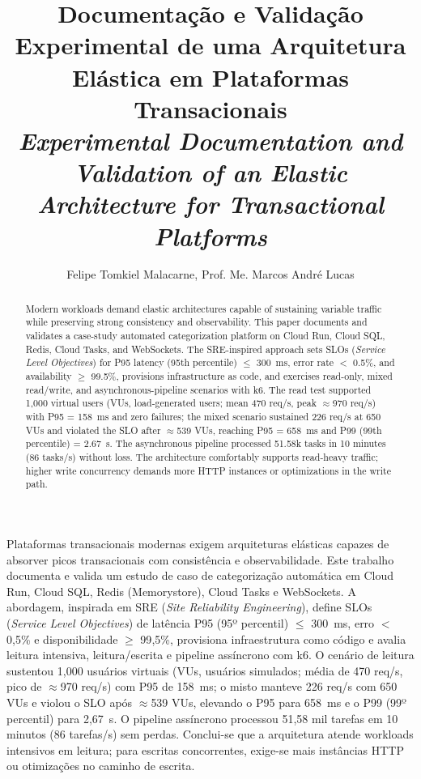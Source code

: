 \documentclass[12pt]{article}
\title{Documentação e Validação Experimental de uma Arquitetura
Elástica em Plataformas Transacionais \\
\medskip
\small{
    \textit{Experimental Documentation and Validation of an Elastic
Architecture for Transactional Platforms} } }
\author{Felipe Tomkiel Malacarne, Prof. Me. Marcos André Lucas}
\begin{document}
\maketitle

\thispagestyle{plain}
\pagestyle{plain2}


\begin{resumo}
Plataformas transacionais modernas exigem arquiteturas elásticas capazes de
absorver picos transacionais com consistência e observabilidade. Este trabalho
documenta e valida um estudo de caso de categorização automática em Cloud Run,
Cloud SQL, Redis (Memorystore), Cloud Tasks e WebSockets. A abordagem, inspirada
em SRE (\textit{Site Reliability Engineering}), define SLOs (\textit{Service
Level Objectives}) de latência P95 (95º percentil) $\leq$ 300~ms, erro $<$ 0,5\%
e disponibilidade $\geq$ 99{,}5\%, provisiona infraestrutura como código e
avalia leitura intensiva, leitura/escrita e pipeline assíncrono com k6. O
cenário de leitura sustentou 1{,}000 usuários virtuais (VUs, usuários simulados;
média de 470 req/s, pico de $\approx$970 req/s) com P95 de 158~ms; o misto
manteve 226 req/s com 650 VUs e violou o SLO após $\approx$539 VUs, elevando o
P95 para 658~ms e o P99 (99º percentil) para 2,67~s. O pipeline assíncrono
processou 51,58 mil tarefas em 10 minutos (86 tarefas/s) sem perdas. Conclui-se
que a arquitetura atende workloads intensivos em leitura; para escritas
concorrentes, exige-se mais instâncias HTTP ou otimizações no caminho de
escrita.
\end{resumo}


\begin{abstract}
Modern workloads demand elastic architectures capable of sustaining
variable traffic while preserving strong consistency and observability. This
paper documents and validates a case-study automated categorization platform on
Cloud Run, Cloud SQL, Redis, Cloud Tasks, and WebSockets. The SRE-inspired
approach sets SLOs (\textit{Service Level Objectives}) for P95 latency (95th
percentile) $\leq$ 300~ms, error rate $<$ 0.5\%, and availability $\geq$ 99.5\%,
provisions infrastructure as code, and exercises read-only, mixed read/write,
and asynchronous-pipeline scenarios with k6. The read test supported 1,000
virtual users (VUs, load-generated users; mean 470 req/s, peak $\approx$970
req/s) with P95 = 158~ms and zero failures; the mixed scenario sustained 226
req/s at 650 VUs and violated the SLO after $\approx$539 VUs, reaching P95 =
658~ms and P99 (99th percentile) = 2.67~s. The asynchronous pipeline processed
51.58k tasks in 10 minutes (86 tasks/s) without loss. The architecture
comfortably supports read-heavy traffic; higher write concurrency demands more
HTTP instances or optimizations in the write path.
\end{abstract}
\end{document}
